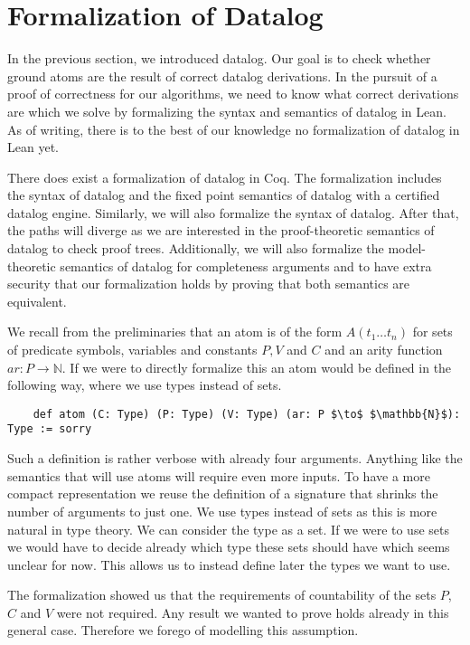 \section{Formalization of Datalog}
In the previous section, we introduced datalog. Our goal is to check whether ground atoms are the result of correct datalog derivations. In the pursuit of a proof of correctness for our algorithms, we need to know what correct derivations are which we solve by formalizing the syntax and semantics of datalog in Lean. As of writing, there is to the best of our knowledge no formalization of datalog in Lean yet. 

There does exist a formalization of datalog in Coq\cite{datalogCoq}. The formalization includes the syntax of datalog and the fixed point semantics of datalog with a certified datalog engine. Similarly, we will also formalize the syntax of datalog. After that, the paths will diverge as we are interested in the proof-theoretic semantics of datalog to check proof trees. Additionally, we will also formalize the model-theoretic semantics of datalog for completeness arguments and to have extra security that our formalization holds by proving that both semantics are equivalent.

We recall from the preliminaries that an atom is of the form $A(t_1 \dots t_n)$ for sets of predicate symbols, variables and constants $P, V$ and $C$ and an arity function $ar: P \to \mathbb{N}$. If we were to directly formalize this an atom would be defined in the following way, where we use types instead of sets.

\begin{lstlisting}
    def atom (C: Type) (P: Type) (V: Type) (ar: P $\to$ $\mathbb{N}$): Type := sorry
\end{lstlisting}

Such a definition is rather verbose with already four arguments. Anything like the semantics that will use atoms will require even more inputs. To have a more compact representation we reuse the definition of a signature that shrinks the number of arguments to just one.  We use types instead of sets as this is more natural in type theory. We can consider the type as a set. If we were to use sets we would have to decide already which type these sets should have which seems unclear for now. This allows us to instead define later the types we want to use. 

The formalization showed us that the requirements of countability of the sets $P$, $C$ and $V$ were not required. Any result we wanted to prove holds already in this general case. Therefore we forego of modelling this assumption.

